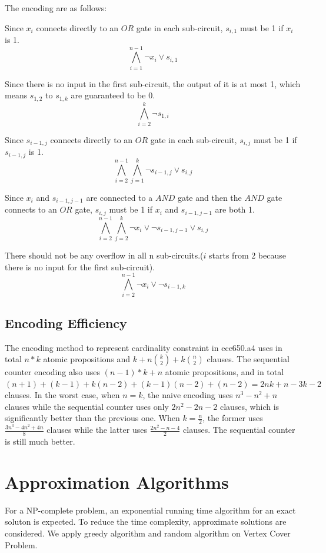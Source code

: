 \documentclass[11pt]{article}
\begin{document}
The encoding are as follows:

Since $x_i$ connects directly to an $OR$ gate in each sub-circuit, $s_{i,1}$ must be 1 if $x_i$ is 1.\[\bigwedge\limits_{i=1}^{n-1} \neg x_i \lor s_{i,1}\]

Since there is no input in the first sub-circuit, the output of it is at most 1, which means $s_{1,2}$ to $s_{1,k}$ are guaranteed to be 0.\[\bigwedge\limits_{i=2}^{k} \neg s_{1,i}\]

Since $s_{i-1,j}$ connects directly to an $OR$ gate in each sub-circuit, $s_{i,j}$ must be 1 if $s_{i-1,j}$ is 1.\[\bigwedge\limits_{i=2}^{n-1}\bigwedge\limits_{j=1}^{k}\neg s_{i-1,j} \lor s_{i,j}\]

Since $x_i$ and $s_{i-1,j-1}$ are connected to a $AND$ gate and then the $AND$ gate connects to an $OR$ gate, $s_{i,j}$ must be 1 if $x_i$ and $s_{i-1,j-1}$ are both 1.\[\bigwedge\limits_{i=2}^{n-1}\bigwedge\limits_{j=2}^{k}\neg x_i\lor\neg s_{i-1,j-1} \lor s_{i,j}\]

There should not be any overflow in all n sub-circuits.($i$ starts from 2 because there is no input for the first sub-circuit).\[\bigwedge\limits_{i=2}^{n-1}\neg x_i\lor\neg s_{i-1,k}\]

\subsection{Encoding Efficiency}
The encoding method to represent cardinality constraint in ece650.a4 uses in total $n*k$ atomic propositions and $k+n{k\choose 2}+k{n\choose 2}$ clauses. The sequential counter encoding also uses $(n-1)*k+n$ atomic propositions, and in total $(n+1)+(k-1)+k(n-2)+(k-1)(n-2)+(n-2)=2nk+n-3k-2$ clauses. In the worst case, when $n=k$, the naive encoding uses $n^3-n^2+n$ clauses while the sequential counter uses only $2n^2-2n-2$ clauses, which is significantly better than the previous one. When $k=\frac{n}{2}$, the former uses $\frac{3n^3-4n^2+4n}{8}$ clauses while the latter uses $\frac{2n^2-n-4}{2}$ clauses. The sequential counter is still much better.
\section{Approximation Algorithms}\label{section-approx}
For a NP-complete problem, an exponential running time algorithm for an exact soluton is expected. To reduce the time complexity, approximate solutions are considered. We apply greedy algorithm and random algorithm on Vertex Cover Problem.
\end{document}
